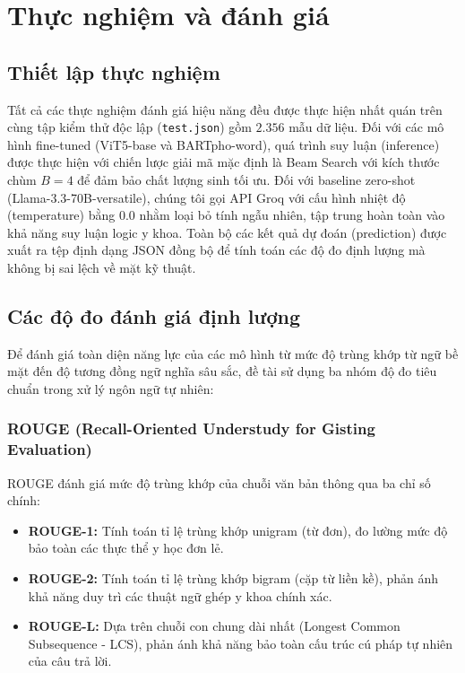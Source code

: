 \chapter{Thực nghiệm và đánh giá}
\section{Thiết lập thực nghiệm}
Tất cả các thực nghiệm đánh giá hiệu năng đều được thực hiện nhất quán trên cùng tập kiểm thử độc lập (\texttt{test.json}) gồm $2.356$ mẫu dữ liệu. Đối với các mô hình fine-tuned (ViT5-base và BARTpho-word), quá trình suy luận (inference) được thực hiện với chiến lược giải mã mặc định là Beam Search với kích thước chùm $B=4$ để đảm bảo chất lượng sinh tối ưu. Đối với baseline zero-shot (Llama-3.3-70B-versatile), chúng tôi gọi API Groq với cấu hình nhiệt độ (temperature) bằng $0.0$ nhằm loại bỏ tính ngẫu nhiên, tập trung hoàn toàn vào khả năng suy luận logic y khoa. Toàn bộ các kết quả dự đoán (prediction) được xuất ra tệp định dạng JSON đồng bộ để tính toán các độ đo định lượng mà không bị sai lệch về mặt kỹ thuật.

\section{Các độ đo đánh giá định lượng}
Để đánh giá toàn diện năng lực của các mô hình từ mức độ trùng khớp từ ngữ bề mặt đến độ tương đồng ngữ nghĩa sâu sắc, đề tài sử dụng ba nhóm độ đo tiêu chuẩn trong xử lý ngôn ngữ tự nhiên:

\subsection{ROUGE (Recall-Oriented Understudy for Gisting Evaluation)}
\cite{lin2004rouge}
ROUGE đánh giá mức độ trùng khớp của chuỗi văn bản thông qua ba chỉ số chính:
\begin{itemize}
    \item \textbf{ROUGE-1:} Tính toán tỉ lệ trùng khớp unigram (từ đơn), đo lường mức độ bảo toàn các thực thể y học đơn lẻ.
    \item \textbf{ROUGE-2:} Tính toán tỉ lệ trùng khớp bigram (cặp từ liền kề), phản ánh khả năng duy trì các thuật ngữ ghép y khoa chính xác.
    \item \textbf{ROUGE-L:} Dựa trên chuỗi con chung dài nhất (Longest Common Subsequence - LCS), phản ánh khả năng bảo toàn cấu trúc cú pháp tự nhiên của câu trả lời.
\end{itemize}

